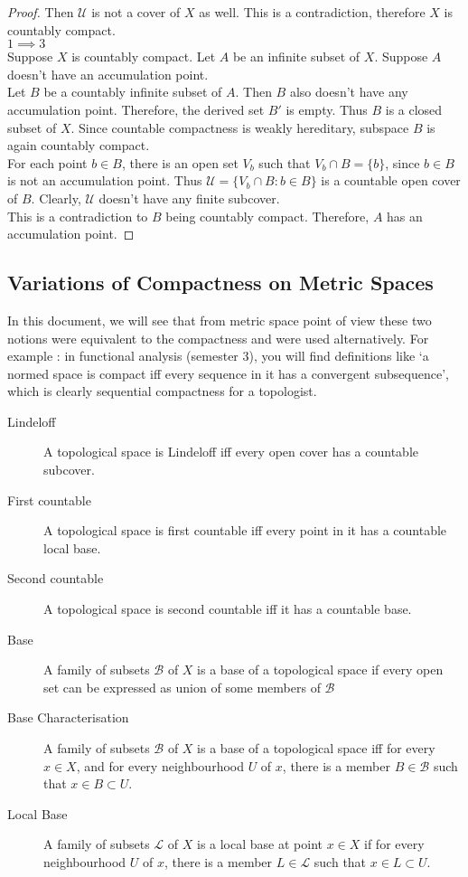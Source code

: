\begin{proof}
	Then $\mathcal{U}$ is not a cover of $X$ as well. This is a contradiction, therefore $X$ is countably compact.\\

	$1 \implies 3$\\
	Suppose $X$ is countably compact. Let $A$ be an infinite subset of $X$. Suppose $A$ doesn't have an accumulation point.\\

	Let $B$ be a countably infinite subset of $A$. Then $B$ also doesn't have any accumulation point. Therefore, the derived set $B'$ is empty. Thus $B$ is a closed subset of $X$. Since countable compactness is weakly hereditary, subspace $B$ is again countably compact.\\

	For each point $b \in B$, there is an open set $V_b$ such that $V_b \cap B = \{ b\}$, since $b \in B$ is not an accumulation point. Thus $\mathcal{U} = \{ V_b \cap B : b \in B \}$ is a countable open cover of $B$. Clearly, $\mathcal{U}$ doesn't have any finite subcover.\\

	This is a contradiction to $B$ being countably compact. Therefore, $A$ has an accumulation point.
\end{proof}

\subsection{Variations of Compactness on Metric Spaces}
	In this document, we will see that from metric space point of view these two notions were equivalent to the compactness and were used alternatively. For example : in functional analysis (semester 3), you will find definitions like `a normed space is compact iff every sequence in it has a convergent subsequence', which is clearly sequential compactness for a topologist.

\begin{description}
	 \item[Lindeloff] A topological space is Lindeloff iff every open cover has a countable subcover.
	\item[First countable] A topological space is first countable iff every point in it has a countable local base.
	\item[Second countable] A topological space is second countable iff it has a countable base.
	\item[Base] A family of subsets $\mathcal{B}$ of $X$ is a base of a topological space if every open set can be expressed as union of some members of $\mathcal{B}$
	\item[Base Characterisation] A family of subsets $\mathcal{B}$ of $X$ is a base of a topological space iff for every $x \in X$, and for every neighbourhood $U$ of $x$, there is a member $B \in \mathcal{B}$ such that $ x \in B \subset U$.
	\item[Local Base] A family of subsets $\mathcal{L}$ of $X$ is a local base at point $x \in X$ if for every neighbourhood $U$ of $x$, there is a member $L \in \mathcal{L}$ such that $x \in L \subset U$.
\end{description}

